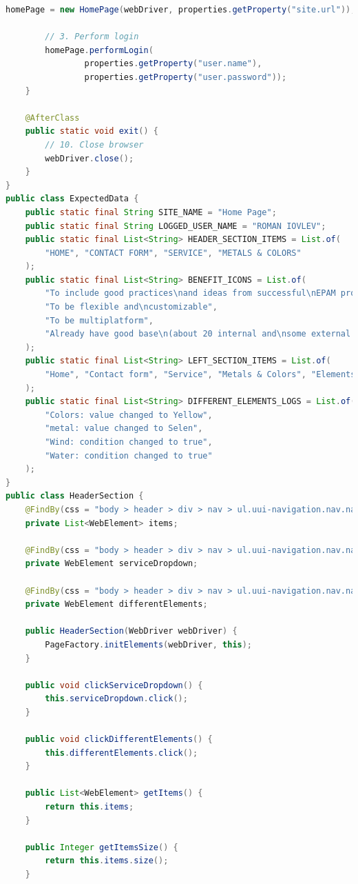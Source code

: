 \documentclass[a4paper]{article}
\begin{document}
\begin{lstlisting}[language=Java]
        homePage = new HomePage(webDriver, properties.getProperty("site.url"));

        // 3. Perform login
        homePage.performLogin(
                properties.getProperty("user.name"),
                properties.getProperty("user.password"));
    }

    @AfterClass
    public static void exit() {
        // 10. Close browser
        webDriver.close();
    }
}
public class ExpectedData {
    public static final String SITE_NAME = "Home Page";
    public static final String LOGGED_USER_NAME = "ROMAN IOVLEV";
    public static final List<String> HEADER_SECTION_ITEMS = List.of(
        "HOME", "CONTACT FORM", "SERVICE", "METALS & COLORS"
    );
    public static final List<String> BENEFIT_ICONS = List.of(
        "To include good practices\nand ideas from successful\nEPAM project",
        "To be flexible and\ncustomizable",
        "To be multiplatform",
        "Already have good base\n(about 20 internal and\nsome external projects),\nwish to get more..."
    );
    public static final List<String> LEFT_SECTION_ITEMS = List.of(
        "Home", "Contact form", "Service", "Metals & Colors", "Elements packs"
    );
    public static final List<String> DIFFERENT_ELEMENTS_LOGS = List.of(
        "Colors: value changed to Yellow",
        "metal: value changed to Selen",
        "Wind: condition changed to true",
        "Water: condition changed to true"
    );
}
public class HeaderSection {
    @FindBy(css = "body > header > div > nav > ul.uui-navigation.nav.navbar-nav.m-l8 > li")
    private List<WebElement> items;

    @FindBy(css = "body > header > div > nav > ul.uui-navigation.nav.navbar-nav.m-l8 > li > a > span")
    private WebElement serviceDropdown;

    @FindBy(css = "body > header > div > nav > ul.uui-navigation.nav.navbar-nav.m-l8 > li.dropdown.open > ul > li:nth-child(8) > a")
    private WebElement differentElements;

    public HeaderSection(WebDriver webDriver) {
        PageFactory.initElements(webDriver, this);
    }

    public void clickServiceDropdown() {
        this.serviceDropdown.click();
    }

    public void clickDifferentElements() {
        this.differentElements.click();
    }

    public List<WebElement> getItems() {
        return this.items;
    }

    public Integer getItemsSize() {
        return this.items.size();
    }


\end{lstlisting}
\end{document}
